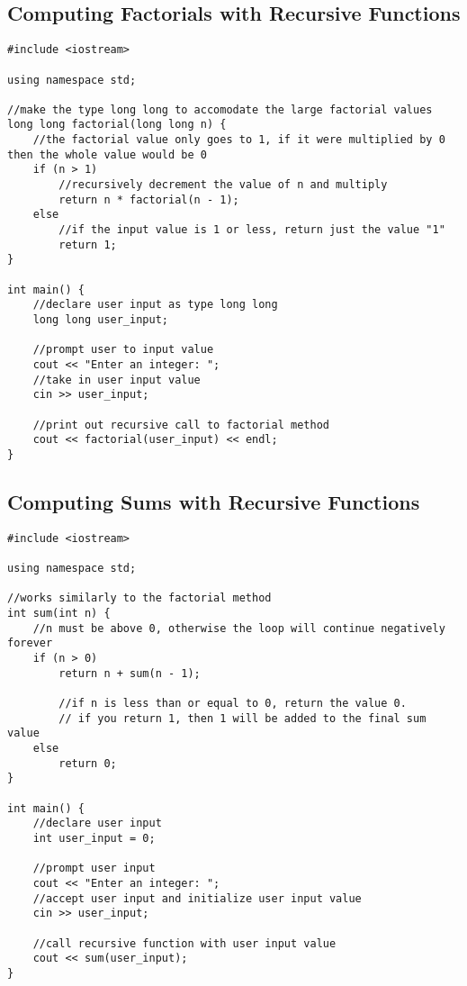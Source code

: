 \documentclass[11pt]{article}
\begin{document}
\subsection*{Computing Factorials with Recursive Functions}
\begin{lstlisting}
#include <iostream>

using namespace std;

//make the type long long to accomodate the large factorial values
long long factorial(long long n) {
    //the factorial value only goes to 1, if it were multiplied by 0 then the whole value would be 0
    if (n > 1)
        //recursively decrement the value of n and multiply
        return n * factorial(n - 1);
    else
        //if the input value is 1 or less, return just the value "1"
        return 1;
}

int main() {
    //declare user input as type long long
    long long user_input;

    //prompt user to input value
    cout << "Enter an integer: ";
    //take in user input value
    cin >> user_input;

    //print out recursive call to factorial method
    cout << factorial(user_input) << endl;
}
\end{lstlisting}

\subsection*{Computing Sums with Recursive Functions}
\begin{lstlisting}
#include <iostream>

using namespace std;

//works similarly to the factorial method
int sum(int n) {
    //n must be above 0, otherwise the loop will continue negatively forever
    if (n > 0)
        return n + sum(n - 1);

        //if n is less than or equal to 0, return the value 0.
        // if you return 1, then 1 will be added to the final sum value
    else
        return 0;
}

int main() {
    //declare user input
    int user_input = 0;

    //prompt user input
    cout << "Enter an integer: ";
    //accept user input and initialize user input value
    cin >> user_input;

    //call recursive function with user input value
    cout << sum(user_input);
}
\end{lstlisting}
\end{document}
